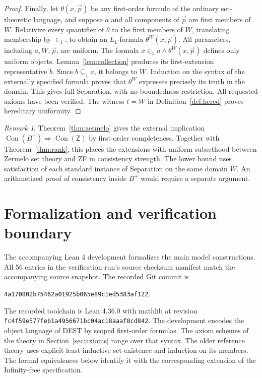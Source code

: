 \documentclass[11pt,a4paper]{article}
\numberwithin{equation}{section}
\theoremstyle{definition}
\theoremstyle{remark}
\newtheorem{remark}[theorem]{Remark}
\newcommand{\Zerm}{\mathsf{Z}}
\newcommand{\Con}{\operatorname{Con}}
\newcommand{\subone}{\subseteq_1}
\newcommand{\extone}{\in_1}
\newcommand{\code}[1]{\nolinkurl{#1}}
\begin{document}
\begin{proof}
Finally, let $\theta(x,\vec p)$ be any first-order formula of the ordinary set-theoretic language, and suppose $a$ and all components of $\vec p$ are first members of $W$. Relativize every quantifier of $\theta$ to the first members of $W$, translating membership by $\extone$, to obtain an $L_1$-formula $\theta^W(x,\vec p)$. All parameters, including $a,W,\vec p$, are uniform. The formula $x\extone a\land\theta^W(x,\vec p)$ defines only uniform objects. Lemma~\ref{lem:collection} produces its first-extension representative $b$. Since $b\subone a$, it belongs to $W$. Induction on the syntax of the externally specified formula proves that $\theta^W$ expresses precisely its truth in the domain. This gives full Separation, with no boundedness restriction. All requested axioms have been verified. The witness $t=W$ in Definition~\ref{def:hered} proves hereditary uniformity.
\end{proof}

\begin{remark}\label{rem:bounds}
Theorem~\ref{thm:zermelo} gives the external implication $\Con(B^+)\Rightarrow\Con(\Zerm)$ by first-order completeness. Together with Theorem~\ref{thm:rank}, this places the extensions with uniform subsethood between Zermelo set theory and ZF in consistency strength. The lower bound uses satisfaction of each standard instance of Separation on the same domain $W$. An arithmetized proof of consistency inside $B^+$ would require a separate argument.
\end{remark}

\section{Formalization and verification boundary}\label{sec:lean}
The accompanying Lean 4 development formalizes the main model constructions. All 56 entries in the verification run's source checksum manifest match the accompanying source snapshot. The recorded Git commit is
\begin{center}\small\texttt{4a170802b75462a01925b065e89c1ed5383af122}.\end{center}
The recorded toolchain is Lean 4.36.0 with mathlib at revision \code{fc4f59e577feb1a4956671bc04ac18aaaf8cd842}. The development encodes the object language of DEST by scoped first-order formulas. The axiom schemes of the theory in Section~\ref{sec:axioms} range over that syntax. The older reference theory uses explicit least-inductive-set existence and induction on its members. The formal equivalences below identify it with the corresponding extension of the Infinity-free specification.
\end{document}
